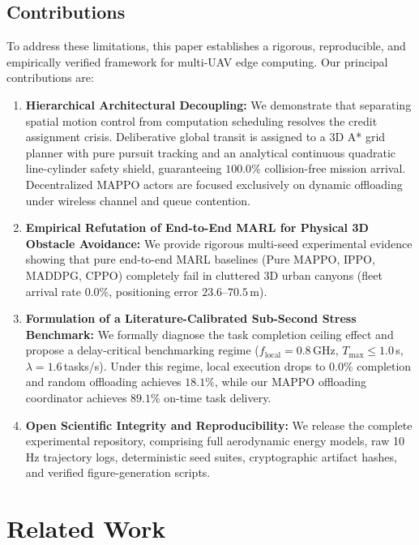 \documentclass[conference]{IEEEtran}
\begin{document}
\subsection{Contributions}
To address these limitations, this paper establishes a rigorous, reproducible, and empirically verified framework for multi-UAV edge computing. Our principal contributions are:
\begin{enumerate}
    \item \textbf{Hierarchical Architectural Decoupling:} We demonstrate that separating spatial motion control from computation scheduling resolves the credit assignment crisis. Deliberative global transit is assigned to a 3D A* grid planner with pure pursuit tracking and an analytical continuous quadratic line-cylinder safety shield, guaranteeing $100.0\%$ collision-free mission arrival. Decentralized MAPPO actors are focused exclusively on dynamic offloading under wireless channel and queue contention.
    \item \textbf{Empirical Refutation of End-to-End MARL for Physical 3D Obstacle Avoidance:} We provide rigorous multi-seed experimental evidence showing that pure end-to-end MARL baselines (Pure MAPPO, IPPO, MADDPG, CPPO) completely fail in cluttered 3D urban canyons (fleet arrival rate $0.0\%$, positioning error $23.6$--$70.5$\,m).
    \item \textbf{Formulation of a Literature-Calibrated Sub-Second Stress Benchmark:} We formally diagnose the task completion ceiling effect and propose a delay-critical benchmarking regime ($f_{\text{local}} = 0.8$\,GHz, $T_{\text{max}} \le 1.0$\,s, $\lambda = 1.6$\,tasks/s). Under this regime, local execution drops to $0.0\%$ completion and random offloading achieves $18.1\%$, while our MAPPO offloading coordinator achieves $89.1\%$ on-time task delivery.
    \item \textbf{Open Scientific Integrity and Reproducibility:} We release the complete experimental repository, comprising full aerodynamic energy models, raw 10\,Hz trajectory logs, deterministic seed suites, cryptographic artifact hashes, and verified figure-generation scripts.
\end{enumerate}

\section{Related Work}
\label{sec:related_work}
\end{document}
